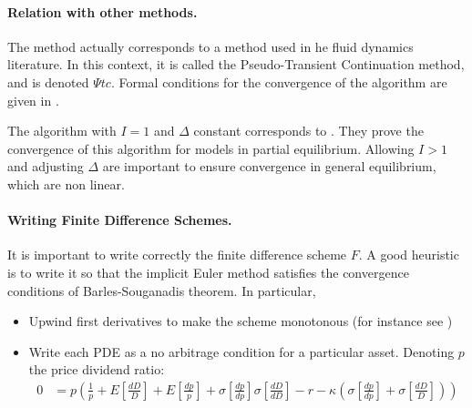 \documentclass[english]{article}
\begin{document}
	\paragraph{Relation with other methods.} 	The method actually corresponds to a method used in he fluid dynamics literature. In this context, it is called the Pseudo-Transient Continuation method, and is denoted $\Psi tc$. Formal conditions for the convergence of the algorithm are given in  \citet{kelley1998convergence}.\par
	The algorithm with $I=1$ and $\Delta$ constant corresponds to \citet{achdou2014heterogeneous}. They prove the convergence of this algorithm for models in partial equilibrium. Allowing $I > 1$ and adjusting $\Delta$  are important to ensure convergence in general equilibrium, which are non linear.

	\paragraph{Writing Finite Difference Schemes.} It is important to write correctly the finite difference scheme $F$. A good heuristic is to write it so that the implicit Euler method satisfies the convergence conditions of Barles-Souganadis theorem. In particular,
	\begin{itemize}
		\item Upwind first derivatives to make the scheme monotonous (for instance see \citet{achdou2014heterogeneous})
		\item Write each PDE as a no arbitrage condition for a particular asset. Denoting $p$ the price dividend ratio:
		\begin{align*}
			0 &= p (\frac{1}{p} + E[\frac{dD}{D}] + E[\frac{dp}{p}] + \sigma[\frac{dp}{dp}]\sigma[\frac{dD}{dD}] - r - \kappa(\sigma[\frac{dp}{dp}] + \sigma[\frac{dD}{D}]))
		\end{align*}
	\end{itemize}
	
	
\end{document}
